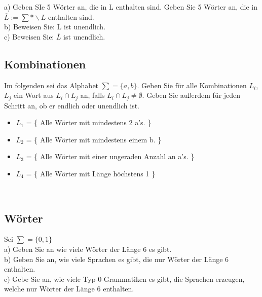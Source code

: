 \documentclass[paper=a4, fontsize=11pt]{scrartcl}
\numberwithin{equation}{section}
\numberwithin{figure}{section}
\numberwithin{table}{section}
\begin{document}
a) Geben SIe 5 Wörter an, die in L enthalten sind. Geben Sie 5 Wörter an, die in $\overline{L} := \sum * \backslash L$ enthalten sind. \\

b) Beweisen Sie: L ist unendlich. \\

c) Beweisen Sie: $\overline{L}$ ist unendlich. \\


\subsection{Kombinationen}

Im folgenden sei das Alphabet $\sum = \{ a,b \}$. Geben Sie für alle Kombinationen $L_{i}$, $L_{j}$ ein Wort aus $L_{i} \cap L_{j}$ an, falls $L_{i} \cap L_{j} \neq \emptyset$. Geben Sie außerdem für jeden Schritt an, ob er endlich oder unendlich ist. \\

\begin{itemize}
\item $L_{1}$ = \{ Alle Wörter mit mindestens 2 a's. \} 
\item $L_{2}$ = \{ Alle Wörter mit mindestens einem b. \}
\item $L_{3}$ = \{ Alle Wörter mit einer ungeraden Anzahl an a's. \}
\item $L_{4}$ = \{ Alle Wörter mit Länge höchstens 1 \}
\end{itemize} 
\\


\subsection{Wörter}

Sei $\sum = \{ 0,1 \}$ \\

a) Geben Sie an wie viele Wörter der Länge 6 es gibt. \\

b) Geben Sie an, wie viele Sprachen es gibt, die nur Wörter der Länge 6 enthalten. \\

c) Gebe Sie an, wie viele Typ-0-Grammatiken es gibt, die Sprachen erzeugen, welche nur Wörter der Länge 6 enthalten. \\
\end{document}
